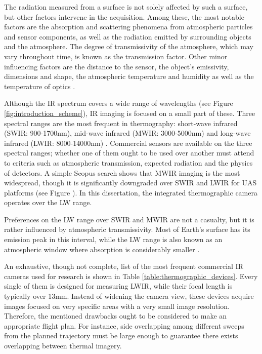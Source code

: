 The radiation measured from a surface is not solely affected by such a surface, but other factors intervene in the acquisition. Among these, the most notable factors are the absorption and scattering phenomena from atmospheric particles and sensor components, as well as the radiation emitted by surrounding objects and the atmosphere. The degree of transmissivity of the atmosphere, which may vary throughout time, is known as the transmission factor. Other minor influencing factors are the distance to the sensor, the object's emissivity, dimensions and shape, the atmospheric temperature and humidity as well as the temperature of optics \cite{vollmer_infrared_2017}. 

Although the IR spectrum covers a wide range of wavelengths (see Figure \ref{fig:introduction_scheme}), IR imaging is focused on a small part of these. Three spectral ranges are the most frequent in thermography: short-wave infrared (SWIR: 900-1700\si{\nano\meter}), mid-wave infrared (MWIR: 3000-5000\si{\nano\meter}) and long-wave infrared (LWIR: 8000-14000\si{\nano\meter}) \cite{gade_thermal_2014, vollmer_infrared_2017}. Commercial sensors are available on the three spectral ranges; whether one of them ought to be used over another must attend to criteria such as atmospheric transmission, expected radiation and the physics of detectors. A simple Scopus search shows that MWIR imaging is the most widespread, though it is significantly downgraded over SWIR and LWIR for UAS platforms (see Figure ). In this dissertation, the integrated thermographic camera operates over the LW range. 

Preferences on the LW range over SWIR and MWIR are not a casualty, but it is rather influenced by atmospheric transmissivity. Most of Earth's surface has its emission peak in this interval, while the LW range is also known as an atmospheric window where absorption is considerably smaller \cite{gonzalez_thermal_2019, quattrochi_thermal_1999}. 

An exhaustive, though not complete, list of the most frequent commercial IR cameras used for research is shown in Table \ref{table:thermographic_devices}. Every single of them is designed for measuring LWIR, while their focal length is typically over 13\si{\milli\meter}. Instead of widening the camera view, these devices acquire images focused on very specific areas with a very small image resolution. Therefore, the mentioned drawbacks ought to be considered to make an appropriate flight plan. For instance, side overlapping among different sweeps from the planned trajectory must be large enough to guarantee there exists overlapping between thermal imagery. 

